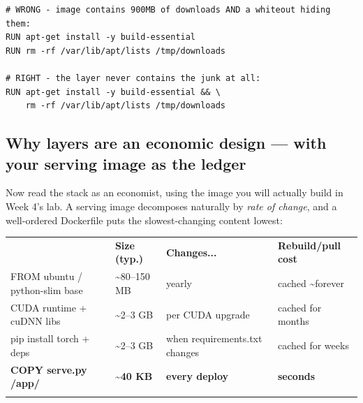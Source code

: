 \begin{terminalbox}
\begin{Verbatim}[breaklines=true,breakanywhere=true,fontsize=\small,formatcom=\color{tbbtermfg},codes=\tbbcodeactive]
# WRONG - image contains 900MB of downloads AND a whiteout hiding them:
RUN apt-get install -y build-essential
RUN rm -rf /var/lib/apt/lists /tmp/downloads

# RIGHT - the layer never contains the junk at all:
RUN apt-get install -y build-essential && \
    rm -rf /var/lib/apt/lists /tmp/downloads
\end{Verbatim}
\end{terminalbox}

\subsection*{Why layers are an economic design — with your serving image as the ledger}

Now read the stack as an economist, using the image you will actually build in Week 4's lab. A serving image decomposes naturally by \textit{rate of change}, and a well-ordered Dockerfile puts the slowest-changing content lowest:

\begin{tbbtablewrap}
  \begin{tabular}{@{}>{\raggedright\arraybackslash}m{\dimexpr 0.3617\tbltextwidth-2\tabcolsep\relax} >{\raggedright\arraybackslash}m{\dimexpr 0.1809\tbltextwidth-2\tabcolsep\relax} >{\raggedright\arraybackslash}m{\dimexpr 0.2234\tbltextwidth-2\tabcolsep\relax} >{\raggedright\arraybackslash}m{\dimexpr 0.2340\tbltextwidth-2\tabcolsep\relax}@{}}
  \arrayrulecolor{tbbnavy}\specialrule{1pt}{0pt}{0pt}
  \rowcolor{tbbtablehead}{\centering \bfseries\color{tbbnavy}Layer (Dockerfile step)} & {\centering \bfseries\color{tbbnavy}Size (typ.)} & {\centering \bfseries\color{tbbnavy}Changes...} & {\centering \bfseries\color{tbbnavy}Rebuild/pull cost} \\
  \arrayrulecolor{tbbnavy}\specialrule{0.7pt}{0pt}{2pt}
  {FROM ubuntu / python-slim base} & {\textasciitilde{}80–150 MB} & {yearly} & {cached \textasciitilde{}forever} \\
  \arrayrulecolor{tbbtableborder}\hline
  {CUDA runtime + cuDNN libs} & {\textasciitilde{}2–3 GB} & {per CUDA upgrade} & {cached for months} \\
  \arrayrulecolor{tbbtableborder}\hline
  {pip install torch + deps} & {\textasciitilde{}2–3 GB} & {when requirements.txt changes} & {cached for weeks} \\
  \arrayrulecolor{tbbtableborder}\hline
  {\textbf{COPY serve.py /app/}} & {\textbf{\textasciitilde{}40 KB}} & {\textbf{every deploy}} & {\textbf{seconds}} \\
  \arrayrulecolor{tbbnavy}\specialrule{1pt}{2pt}{0pt}
  \end{tabular}\par
\end{tbbtablewrap}

